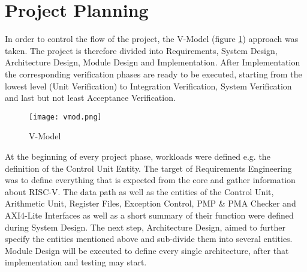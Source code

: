 \section{Project Planning}
In order to control the flow of the project, the V-Model (figure \ref{fig:vmod}) approach was taken. The
project is therefore divided into Requirements, System Design, Architecture Design,
Module Design and Implementation. After Implementation the corresponding
verification phases are ready to be executed, starting from the lowest level (Unit
Verification) to Integration Verification, System Verification and last but not least
Acceptance Verification.


\begin{figure}[h]
	\centering
	\texttt{[image: vmod.png]}
	\caption{V-Model}
	\label{fig:vmod}
\end{figure}

At the beginning of every project phase, workloads were defined e.g. the definition of
the Control Unit Entity. The target of Requirements Engineering was to define
everything that is expected from the core and gather information about RISC-V. The
data path as well as the entities of the Control Unit, Arithmetic Unit, Register Files,
Exception Control, \acs{PMP} \& \acs{PMA} Checker and AXI4-Lite Interfaces as well as a short
summary of their function were defined during System Design. The next step,
Architecture Design, aimed to further specify the entities mentioned above and
sub-divide them into several entities. Module Design will be executed to define every
single architecture, after that implementation and testing may start.


